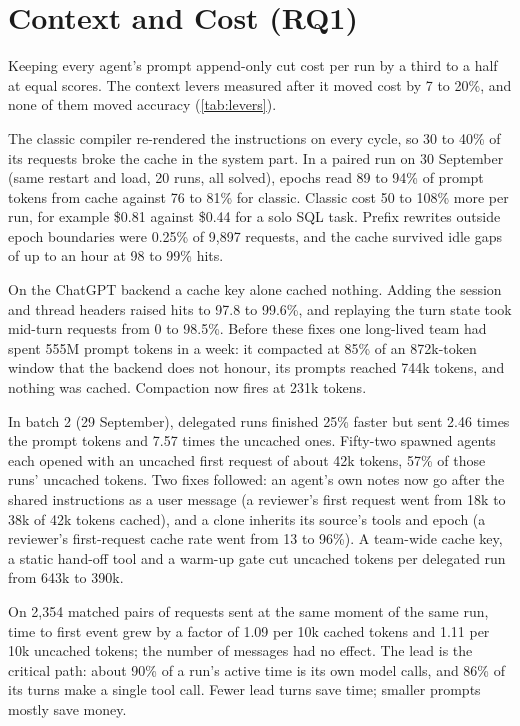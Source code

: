 \section{Context and Cost (RQ1)}
\label{sec:context}

Keeping every agent's prompt append-only cut cost per run by a third to a half at equal scores. The
context levers measured after it moved cost by 7 to 20\%, and none of them moved accuracy
(\cref{tab:levers}).

 The classic compiler re-rendered the instructions on every cycle, so 30
to 40\% of its requests broke the cache in the system part. In a paired run on 30 September (same
restart and load, 20 runs, all solved), epochs read 89 to 94\% of prompt tokens from cache against
76 to 81\% for classic. Classic cost 50 to 108\% more per run, for example \$0.81 against \$0.44
for a solo SQL task. Prefix rewrites outside epoch boundaries were 0.25\% of 9,897 requests, and the
cache survived idle gaps of up to an hour at 98 to 99\% hits.

 On the ChatGPT backend a cache key
alone cached nothing. Adding the session and thread headers raised hits to 97.8 to 99.6\%, and
replaying the turn state took mid-turn requests from 0 to 98.5\%. Before these fixes one
long-lived team had spent 555M prompt tokens in a week: it compacted at 85\% of an 872k-token
window that the backend does not honour, its prompts reached 744k tokens, and nothing was cached.
Compaction now fires at 231k tokens.

 In batch 2 (29 September), delegated runs finished
25\% faster but sent 2.46 times the prompt tokens and 7.57 times the uncached ones. Fifty-two
spawned agents each opened with an uncached first request of about 42k tokens, 57\% of those runs'
uncached tokens. Two fixes followed: an agent's own notes now go after the shared instructions as a
user message (a reviewer's first request went from 18k to 38k of 42k tokens cached), and a clone
inherits its source's tools and epoch (a reviewer's first-request cache rate went from 13 to
96\%). A team-wide cache key, a static hand-off tool and a warm-up gate cut uncached tokens per
delegated run from 643k to 390k.

 On 2,354 matched pairs of requests sent at the same
moment of the same run, time to first event grew by a factor of 1.09 per 10k cached tokens and
1.11 per 10k uncached tokens; the number of messages had no effect. The lead is the critical path:
about 90\% of a run's active time is its own model calls, and 86\% of its turns make a single tool
call. Fewer lead turns save time; smaller prompts mostly save money.

